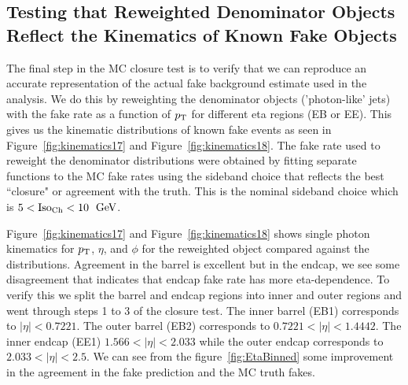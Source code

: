 \subsection{Testing that Reweighted Denominator Objects Reflect the Kinematics of Known Fake Objects}

The final step in the MC closure test is to verify that we can reproduce an accurate representation of the actual fake background estimate used in the analysis. We do this by reweighting the denominator objects ('photon-like' jets) with the fake rate as a function of $p_{\mathrm{T}}$ for different eta regions (EB or EE). This gives us the kinematic distributions of known fake events as seen in Figure~\ref{fig:kinematics17} and Figure~\ref{fig:kinematics18}. The fake rate used to reweight the denominator distributions were obtained by fitting separate functions to the MC fake rates using the sideband choice that reflects the best ``closure" or agreement with the truth. This is the nominal sideband choice which is $5 < \text{Iso}_{\text{Ch}} < 10$ $\,\text{Ge\hspace{-.08em}V}$.

Figure~\ref{fig:kinematics17} and Figure~\ref{fig:kinematics18} shows single photon kinematics for $p_{\mathrm{T}}$, $\eta$, and $\phi$ for the reweighted object compared against the distributions. Agreement in the barrel is excellent but in the endcap, we see some disagreement that indicates that endcap fake rate has more eta-dependence. To verify this we split the barrel and endcap regions into inner and outer regions and went through steps 1 to 3 of the closure test. The inner barrel (EB1) corresponds to $|\eta| <  0.7221$. The outer barrel (EB2) corresponds to $0.7221 < |\eta| < 1.4442$. The inner endcap (EE1) $1.566 < |\eta| < 2.033$ while the outer endcap corresponds to $2.033 < \lvert \eta \rvert< 2.5$. We can see from the figure~\ref{fig:EtaBinned} some improvement in the agreement in the fake prediction and the MC truth fakes.




